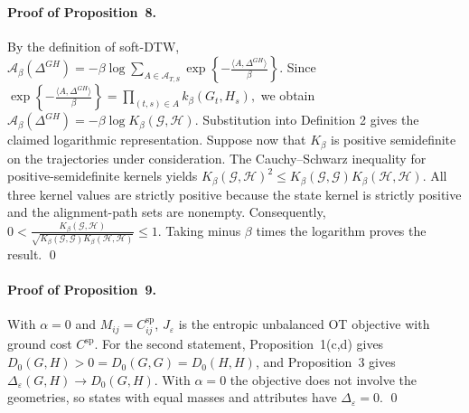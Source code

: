 \documentclass[12pt]{article}
\begin{document}
\paragraph{Proof of Proposition~8.}
By the definition of soft-DTW,\\
$
\mathcal A_\beta(\Delta^{GH})
=
-\beta\log
\sum_{A\in\mathcal A_{T,S}}
\exp\left\{
-\frac{\langle A,\Delta^{GH}\rangle}{\beta}
\right\}.
$
Since
$
\exp\left\{
-\frac{\langle A,\Delta^{GH}\rangle}{\beta}
\right\}
=
\prod_{(t,s)\in A}
k_\beta(G_t,H_s),
$
we obtain
$
\mathcal A_\beta(\Delta^{GH})
=
-\beta\log K_\beta(\mathcal G,\mathcal H).
$
Substitution into Definition 2 gives the
claimed logarithmic representation.
Suppose now that $K_\beta$ is positive
semidefinite on the trajectories under
consideration. The Cauchy--Schwarz inequality
for positive-semidefinite kernels yields
$
K_\beta(\mathcal G,\mathcal H)^2
\leq
K_\beta(\mathcal G,\mathcal G)
K_\beta(\mathcal H,\mathcal H).
$
All three kernel values are strictly positive
because the state kernel is strictly positive
and the alignment-path sets are nonempty.
Consequently,
$
0<
\frac{K_\beta(\mathcal G,\mathcal H)}
{\sqrt{
K_\beta(\mathcal G,\mathcal G)
K_\beta(\mathcal H,\mathcal H)}}
\leq1.
$
Taking minus $\beta$ times the logarithm
proves the result. \qed

\paragraph{Proof of Proposition~9.}
With $\alpha=0$ and $M_{ij}=C^{\mathrm{sp}}_{ij}$, $J_\varepsilon$ is the entropic unbalanced OT objective with ground cost $C^{\mathrm{sp}}$. For the second statement, Proposition~1(c,d) gives $D_0(G,H)>0=D_0(G,G)=D_0(H,H)$, and Proposition~3 gives $\Delta_\varepsilon(G,H)\to D_0(G,H)$. With $\alpha=0$ the objective does not involve the geometries, so states with equal masses and attributes have $\Delta_\varepsilon=0$. \qed
\end{document}
